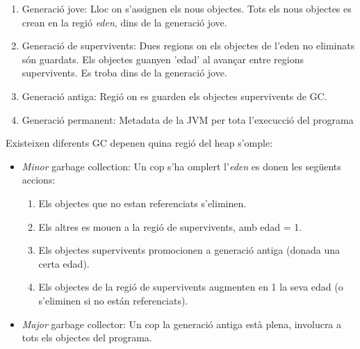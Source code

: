\begin{enumerate}
    \item Generació jove: Lloc on s'assignen els nous objectes. Tots els nous objectes es crean en la regió \textit{eden}, dins de la generació jove. 
    \item Generació de supervivents: Dues regions on els objectes de l'eden no eliminats són guardats. Els objectes guanyen 'edad' al avançar entre regions supervivents. Es troba dins de la generació jove.
    \item Generació antiga: Regió on es guarden els objectes supervivents de GC.
    \item Generació permanent: Metadata de la JVM per tota l'execucció del programa
\end{enumerate}
\begin{minipage}{\textwidth}    %
Existeixen diferents GC depenen quina regió del heap s'omple:
\begin{itemize}
    \item \textit{Minor} garbage collection: Un cop s'ha omplert l'\textit{eden} es donen les següents accions:
    \begin{enumerate}
        \item Els objectes que no estan referenciats s'eliminen.
        \item Els altres es mouen a la regió de supervivents, amb edad = 1.
        \item Els objectes supervivents promocionen a generació antiga (donada una certa edad).
        \item Els objectes de la regió de supervivents augmenten en 1 la seva edad (o s'eliminen si no están referenciats).
    \end{enumerate}
    \item \textit{Major} garbage collector: Un cop la generació antiga està plena, involucra a tots els objectes del programa.
\end{itemize}
\end{minipage}

